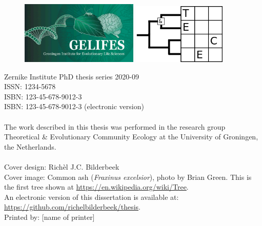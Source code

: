 \begin{titlepage}
	\vfill
	\begin{figure}[!h]
		\includegraphics[width=0.5\textwidth]{images/frontmatter/gelifes_header_600x320.png}
		\includegraphics[width=0.4\textwidth]{images/frontmatter/tece_logo_2.png}
	\end{figure}
	\noindent
	{\small 
		Zernike Institute PhD thesis series 2020-09 \\
		ISSN: 1234-5678\\
		ISBN:	123-45-678-9012-3 \\
		ISBN: 123-45-678-9012-3 (electronic version) \\
		\\
		The work described in this thesis was performed in the research group 
    Theoretical \& Evolutionary Community Ecology at the University of Groningen, the Netherlands. \\
		\\
		Cover design: Rich\`el J.C. Bilderbeek\\
		Cover image: Common ash (\textit{Fraxinus excelsior}), photo by Brian Green. 
    This is the first tree shown at \url{https://en.wikipedia.org/wiki/Tree}.
		\\
		An electronic version of this dissertation is available at: \\
	  \url{https://github.com/richelbilderbeek/thesis}. \\
		Printed by: [name of printer] \\
		} 	
	
	
	\clearpage
	
	
	
\end{titlepage}
